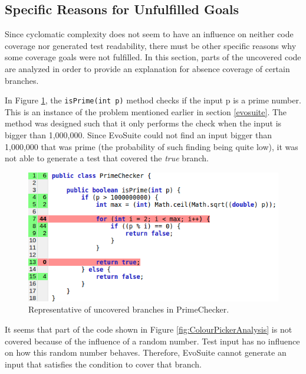 \subsection{Specific Reasons for Unfulfilled Goals}

Since cyclomatic complexity does not seem to have an influence on neither code coverage nor generated test readability, there must be other specific reasons why some coverage goals were not fulfilled. 
In this section, parts of the uncovered code are analyzed in order to provide an explanation for absence coverage of certain branches. 

In Figure \ref{fig:PrimeCheckerAnalysis}, the \verb|isPrime(int p)| method checks if the input p is a prime number. 
This is an instance of the problem mentioned earlier in section \ref{evosuite}.
The method was designed such that it only performs the check when the input is bigger than 1,000,000. 
Since EvoSuite could not find an input bigger than 1,000,000 that was prime (the probability of such finding being quite low), it was not able to generate a test that covered the \textit{true} branch. 

\begin{figure}
\centering
\begin{minipage}[c]{\textwidth}
        \includegraphics[width=.65\textwidth]{CoverageAnalysis/PrimeChecker.png}
    \caption{Representative of uncovered branches in PrimeChecker.}
    \label{fig:PrimeCheckerAnalysis}
    \vspace{.5cm} 
\end{minipage}
\end{figure}

It seems that part of the code shown in Figure \ref{fig:ColourPickerAnalysis} is not covered because of the influence of a random number.
Test input has no influence on how this random number behaves.
Therefore, EvoSuite cannot generate an input that satisfies the condition to cover that branch. 


